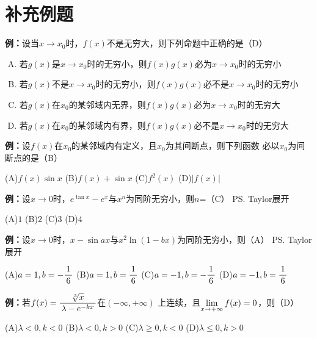 \newpage

\section*{补充例题}

{\bf 例：}设当$x\to
x_0$时，$f(x)$不是无穷大，则下列命题中正确的是（D）
\begin{enumerate}[(A)]
  \setlength{\itemindent}{1cm}
  \item 若$g(x)$是$x\to x_0$时的无穷小，则$f(x)g(x)$必为$x\to x_0$时的无穷小
  \item 若$g(x)$不是$x\to x_0$时的无穷小，则$f(x)g(x)$必不是$x\to x_0$时的无穷小
  \item 若$g(x)$在$x_0$的某邻域内无界，则$f(x)g(x)$必为$x\to x_0$时的无穷大
  \item 若$g(x)$在$x_0$的某邻域内有界，则$f(x)g(x)$必不是$x\to x_0$时的无穷大
\end{enumerate}

{\bf 例：}设$f(x)$在$x_0$的某邻域内有定义，且$x_0$为其间断点，则下列函数
必以$x_0$为间断点的是（B）

\quad
(A)\;$f(x)\sin x$\hspace{2cm}
(B)\;$f(x)+\sin x$\hspace{2cm}
(C)\;$f^2(x)$\hspace{2cm}
(D)\;$|f(x)|$ 

{\bf 例：}设$x\to 0$时，$e^{\tan x}-e^x$与$x^n$为同阶无穷小，则$n$=（C）
\ps{Taylor展开}

\quad
(A)\;$1$\hspace{2cm}
(B)\;$2$\hspace{2cm}
(C)\;$3$\hspace{2cm}
(D)\;$4$ 

{\bf 例：}设$x\to 0$时，$x-\sin ax$与$x^2\ln(1-bx)$为同阶无穷小，则（A）
\ps{Taylor展开}

\quad
(A)\;$a=1,b=-\displaystyle\frac{\,{1}\,}{\,{6}\,}$\hspace{1em}
(B)\;$a=1,b=\displaystyle\frac{\,{1}\,}{\,{6}\,}$\hspace{1em}
(C)\;$a=-1,b=-\displaystyle\frac{\,{1}\,}{\,{6}\,}$\hspace{1em}
(D)\;$a=-1,b=\displaystyle\frac{\,{1}\,}{\,{6}\,}$

{\bf 例：}若$f(x)=\displaystyle\frac{\,{\sqrt[3]{x}}\,}{\,{\lambda-e^{-kx}}\,}$在$(-\infty,+\infty)$
上连续，且$\lim\limits_{x\to{+\infty}}f(x)=0$，则（D）

\quad
(A)\;$\lambda<0,k<0$\hspace{1cm}
(B)\;$\lambda<0,k>0$\hspace{1cm}
(C)\;$\lambda\geq0,k<0$\hspace{1cm}
(D)\;$\lambda\leq0,k>0$

